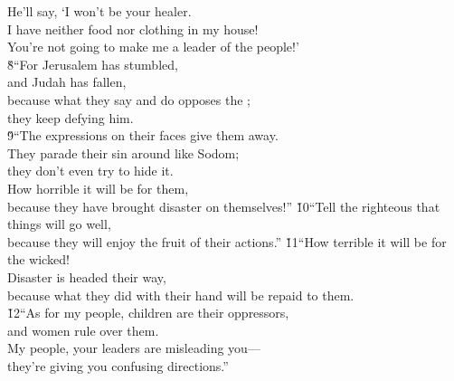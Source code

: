 \begin{poetry}
\poemll    He'll say, `I won't be your healer. \\
\poeml I have neither food nor clothing in my house! \\
\poemll    You're not going to make me a leader of the people!' \\
\poeml \v{8}``For Jerusalem has stumbled, \\
\poemll    and Judah has fallen, \\
\poeml because what they say and do opposes the ; \\
\poemll    they keep defying him. \\
\poeml \v{9}``The expressions on their faces give them away. \\
\poemll    They parade their sin around like Sodom; \\
\poemlll       they don't even try to hide it. \\
\poeml How horrible it will be for them, \\
\poemll    because they have brought disaster on themselves!''
\poeml \v{10}``Tell the righteous that things will go well, \\
\poemll    because they will enjoy the fruit of their actions.''
\poeml \v{11}``How terrible it will be for the wicked! \\
\poemll    Disaster is headed their way, \\
\poemlll       because what they did with their hand will be repaid to them. \\
\poeml \v{12}``As for my people, children are their oppressors, \\
\poemll    and women rule over them. \\
\poeml My people, your leaders are misleading you--- \\
\poemll    they're giving you confusing directions.''

\end{poetry}

